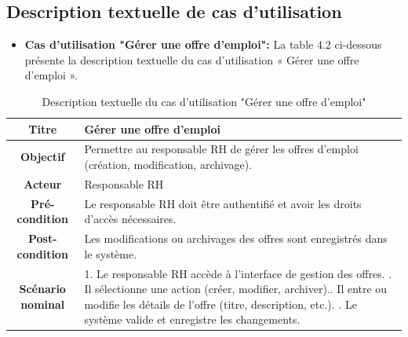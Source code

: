 \subsection{Description textuelle de cas d'utilisation}
    \begin{itemize}
        \item \textbf{Cas d'utilisation "Gérer une offre d'emploi": } La table 4.2 ci-dessous présente la description textuelle du cas d'utilisation « Gérer une offre d'emploi ».
    \end{itemize}
    \begin{table}[H]
    \caption{ Description textuelle du cas d’utilisation "Gérer une offre d'emploi"}
    \centering
    \begin{tabular}{|c|p{12cm}|}
    \hline
    \textbf{Titre} & Gérer une offre d'emploi \\
    \hline
    \textbf{Objectif} & Permettre au responsable RH de gérer les offres d’emploi (création, modification, archivage). \\
    \hline
    \textbf{Acteur}& Responsable RH\\
    \hline
    \textbf{Pré-condition} & Le responsable RH doit être authentifié et avoir les droits d’accès nécessaires.
    \\
    \hline
    \textbf{Post-condition} & Les modifications ou archivages des offres sont enregistrés dans le système.\\
    \hline
    \textbf{Scénario nominal} & 1. Le responsable RH accède à l’interface de gestion des offres. \newline
    2. Il sélectionne une action (créer, modifier, archiver).\newline
    3. Il entre ou modifie les détails de l’offre (titre, description, etc.).
    \newline
    4. Le système valide et enregistre les changements.\\
    \hline
    \end{tabular}
    \label{tab:user_stories}
\end{table}

